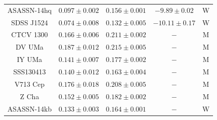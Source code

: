 \begin{table}
\begin{tabular}{ccccc}
        ASASSN-14hq     & $0.097\pm0.002$  & $0.156\pm0.001$   & $  -9.89 \pm 0.02$   & W \\
        SDSS J1524      & $0.074\pm0.008$  & $0.132\pm0.005$   & $ -10.11 \pm 0.17$   & W \\
        CTCV 1300       & $0.166\pm0.006$  & $0.211\pm0.002$   & $-$                  & M \\
        DV UMa          & $0.187\pm0.012$  & $0.215\pm0.005$   & $-$                  & M \\
        IY UMa          & $0.141\pm0.007$  & $0.177\pm0.002$   & $-$                  & M \\
        SSS130413       & $0.140\pm0.012$  & $0.163\pm0.004$   & $-$                  & M \\
        V713 Cep        & $0.176\pm0.018$  & $0.208\pm0.005$   & $-$                  & M \\
        Z Cha           & $0.152\pm0.005$  & $0.182\pm0.002$   & $-$                  & M \\
        ASASSN-14kb     & $0.133\pm0.003$  & $0.164\pm0.001$   & $-$                  & W \\
        \hline
    \end{tabular}
\end{table}

